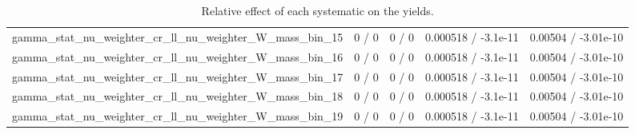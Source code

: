 \documentclass[10pt]{article}
\begin{document}
\begin{table}[htbp]
\begin{center}
\begin{tabular}{|c|c|c|c|c|}
  gamma_stat_nu_weighter_cr_ll_nu_weighter_W_mass_bin_15 & 0 / 0 & 0 / 0 & 0.000518 / -3.1e-11 & 0.00504 / -3.01e-10 \\ 
  gamma_stat_nu_weighter_cr_ll_nu_weighter_W_mass_bin_16 & 0 / 0 & 0 / 0 & 0.000518 / -3.1e-11 & 0.00504 / -3.01e-10 \\ 
  gamma_stat_nu_weighter_cr_ll_nu_weighter_W_mass_bin_17 & 0 / 0 & 0 / 0 & 0.000518 / -3.1e-11 & 0.00504 / -3.01e-10 \\ 
  gamma_stat_nu_weighter_cr_ll_nu_weighter_W_mass_bin_18 & 0 / 0 & 0 / 0 & 0.000518 / -3.1e-11 & 0.00504 / -3.01e-10 \\ 
  gamma_stat_nu_weighter_cr_ll_nu_weighter_W_mass_bin_19 & 0 / 0 & 0 / 0 & 0.000518 / -3.1e-11 & 0.00504 / -3.01e-10 \\ 
\hline 
\end{tabular} 
\caption{Relative effect of each systematic on the yields.} 
\end{center} 
\end{table} 
\end{document}
